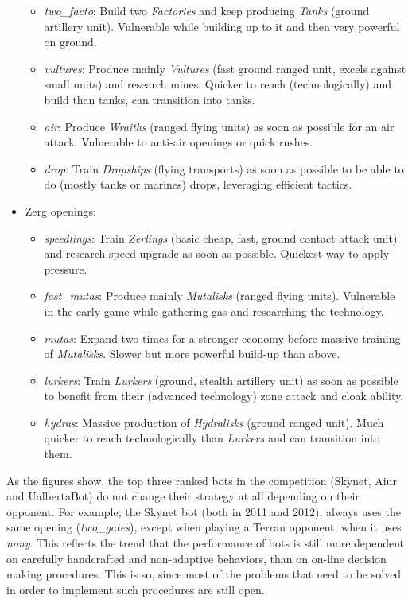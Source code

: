 \documentclass[journal]{IEEEtran}
\begin{document}
\begin{itemize}
\begin{itemize}
    \item \emph{two\_facto}: Build two \emph{Factories} and keep producing \emph{Tanks} (ground artillery unit). Vulnerable while building up to it and then very powerful on ground.
    \item \emph{vultures}: Produce mainly \emph{Vultures} (fast ground ranged unit, excels against small units) and research mines. Quicker to reach (technologically) and build than tanks, can transition into tanks.
    \item \emph{air}: Produce \emph{Wraiths} (ranged flying units) as soon as possible for an air attack. Vulnerable to anti-air openings or quick rushes.
    \item \emph{drop}: Train \emph{Dropships} (flying transports) as soon as possible to be able to do (mostly tanks or marines) drops, leveraging efficient tactics.
  \end{itemize}
  \item Zerg openings:
  \begin{itemize}
    \item \emph{speedlings}: Train \emph{Zerlings} (basic cheap, fast, ground contact attack unit) and research speed upgrade as soon as possible. Quickest way to apply pressure.
    \item \emph{fast\_mutas}: Produce mainly \emph{Mutalisks} (ranged flying units). Vulnerable in the early game while gathering gas and researching the technology.
    \item \emph{mutas}: Expand two times for a stronger economy before massive training of \emph{Mutalisks}. Slower but more powerful build-up than above.
    \item \emph{lurkers}: Train \emph{Lurkers} (ground, stealth artillery unit) as soon as possible to benefit from their (advanced technology) zone attack and cloak ability. 
    \item \emph{hydras}: Massive production of \emph{Hydralisks} (ground ranged unit). Much quicker to reach technologically than \emph{Lurkers} and can transition into them.
  \end{itemize}
\end{itemize}

As the figures show, the top three ranked bots in the competition (Skynet, Aiur and UalbertaBot) do not change their strategy at all depending on their opponent. For example, the Skynet bot (both in 2011 and 2012), always uses the same opening (\emph{two\_gates}), except when playing a Terran opponent, when it uses \emph{nony}. This reflects the trend that the performance of bots is still more dependent on carefully handcrafted and non-adaptive behaviors, than on on-line decision making procedures. This is so, since most of the problems that need to be solved in order to implement such procedures are still open.
\end{document}
